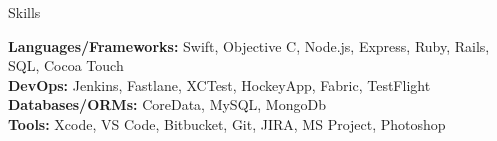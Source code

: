 \documentclass{resume} %
\begin{document}

\begin{rSection}{Skills}

\textbf{Languages/Frameworks:} Swift, Objective C, Node.js, Express, Ruby, Rails, SQL, Cocoa Touch  \\
\textbf{DevOps:} Jenkins, Fastlane, XCTest, HockeyApp, Fabric, TestFlight \\
\textbf{Databases/ORMs:} CoreData, MySQL, MongoDb  \\
\textbf{Tools:} Xcode, VS Code, Bitbucket, Git, JIRA, MS Project, Photoshop  \\

\end{rSection}

\end{document}
